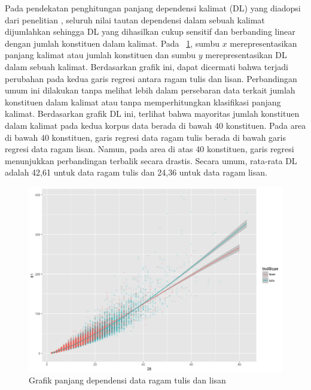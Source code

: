 Pada pendekatan penghitungan panjang dependensi kalimat (DL) yang diadopsi dari penelitian \cite{futrell2015large}, seluruh nilai tautan dependensi dalam sebuah kalimat dijumlahkan sehingga DL yang dihasilkan cukup sensitif dan berbanding linear dengan jumlah konstituen dalam kalimat. Pada \pic~\ref{fig:lisantulis_DL}, sumbu $x$ merepresentasikan panjang kalimat atau jumlah konstituen dan sumbu $y$ merepresentasikan DL dalam sebuah kalimat. Berdasarkan grafik ini, dapat dicermati bahwa terjadi perubahan pada kedua garis regresi antara ragam tulis dan lisan. Perbandingan umum ini dilakukan tanpa melihat lebih dalam persebaran data terkait jumlah konstituen dalam kalimat atau tanpa memperhitungkan klasifikasi panjang kalimat. Berdasarkan grafik DL ini, terlihat bahwa mayoritas jumlah konstituen dalam kalimat pada kedua korpus data berada di bawah 40 konstituen. Pada area di bawah 40 konstituen, garis regresi data ragam tulis berada di bawah garis regresi data ragam lisan. Namun, pada area di atas 40 konstituen, garis regresi menunjukkan perbandingan terbalik secara drastis. Secara umum, rata-rata DL adalah 42,61 untuk data ragam tulis dan 24,36 untuk data ragam lisan. 

\begin{figure}
	\centering \includegraphics[width=1
	\textwidth] {pics/lisantulis_DL.png} 
	\caption{Grafik panjang dependensi data ragam tulis dan lisan} 
\label{fig:lisantulis_DL} 
\end{figure}


